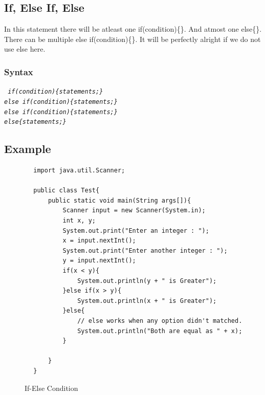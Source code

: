 \documentclass[openany]{book}  %
\begin{document}
\begin{flushleft}
    \subsection{If, Else If, Else}
    In this statement there will be atleast one if(condition)\{\}. And atmost one else\{\}. There can be multiple else if(condition)\{\}. It will be perfectly alright if we do not use else here.
    \subsubsection{Syntax}
    \begin{center}
        \tt{
            \textit{if(condition)\{statements;\}\\else if(condition)\{statements;\}\\else if(condition)\{statements;\}\\else\{statements;\}}
        }
    \end{center}
    \subsection{Example}
    \begin{center}
        \begin{verbatim}
        import java.util.Scanner;

        public class Test{
            public static void main(String args[]){
                Scanner input = new Scanner(System.in);
                int x, y;
                System.out.print("Enter an integer : ");
                x = input.nextInt();
                System.out.print("Enter another integer : ");
                y = input.nextInt();
                if(x < y){
                    System.out.println(y + " is Greater");
                }else if(x > y){
                    System.out.println(x + " is Greater");
                }else{
                    // else works when any option didn't matched.
                    System.out.println("Both are equal as " + x);
                }

            }
        }
    \end{verbatim}
    \end{center}
    \begin{figure}[htbp]
        \begin{center}
            \caption{If-Else Condition}
        \end{center}
    \end{figure}

\end{flushleft}
\end{document}
